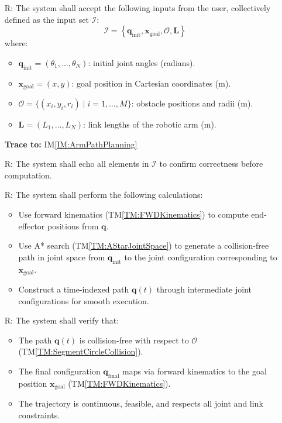 \documentclass[12pt]{article}
\newcommand{\tref}[1]{TM\ref{#1}}
\newcommand{\iref}[1]{IM\ref{#1}}
\newcounter{reqnum} %
\begin{document}
\noindent \begin{itemize}

  \item[R\refstepcounter{reqnum}\thereqnum \label{R_Inputs}:]  
    The system shall accept the following inputs from the user, collectively defined as the input set \( \mathcal{I} \):
    \[
      \mathcal{I} = \left\{ \mathbf{q}_{\text{init}}, \mathbf{x}_{\text{goal}}, \mathcal{O}, \mathbf{L} \right\}
    \]
    where:
    \begin{itemize}
      \item \( \mathbf{q}_{\text{init}} = (\theta_1, \dots, \theta_N) \): initial joint angles (radians).
      \item \( \mathbf{x}_{\text{goal}} = (x, y) \): goal position in Cartesian coordinates (\si{\metre}).
      \item \( \mathcal{O} = \{ (x_i, y_i, r_i) \mid i = 1,\dots,M \} \): obstacle positions and radii (\si{\metre}).
      \item \( \mathbf{L} = (L_1, \dots, L_N) \): link lengths of the robotic arm (\si{\metre}).
    \end{itemize}
    \textbf{Trace to:} \iref{IM:ArmPathPlanning}

  \item[R\refstepcounter{reqnum}\thereqnum \label{R_OutputInputs}:]  
    The system shall echo all elements in \( \mathcal{I} \) to confirm correctness before computation.  
    

  \item[R\refstepcounter{reqnum}\thereqnum \label{R_Calculate}:]  
    The system shall perform the following calculations:
    \begin{itemize}
      \item Use forward kinematics (\tref{TM:FWDKinematics}) to compute end-effector positions from \( \mathbf{q} \).
      \item Use A* search (\tref{TM:AStarJointSpace}) to generate a collision-free path in joint space from \( \mathbf{q}_{\text{init}} \) to the joint configuration corresponding to \( \mathbf{x}_{\text{goal}} \).
      \item Construct a time-indexed path \( \mathbf{q}(t) \) through intermediate joint configurations for smooth execution.
    \end{itemize}
    

  \item[R\refstepcounter{reqnum}\thereqnum \label{R_VerifyOutput}:]  
    The system shall verify that:
    \begin{itemize}
      \item The path \( \mathbf{q}(t) \) is collision-free with respect to \( \mathcal{O} \) (\tref{TM:SegmentCircleCollision}).
      \item The final configuration \( \mathbf{q}_{\text{final}} \) maps via forward kinematics to the goal position \( \mathbf{x}_{\text{goal}} \) (\tref{TM:FWDKinematics}).
      \item The trajectory is continuous, feasible, and respects all joint and link constraints.
    \end{itemize}
    


\end{itemize}
\end{document}
